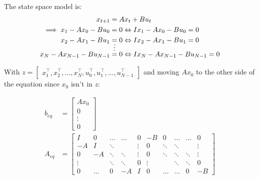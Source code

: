 \documentclass[11pt, a4paper, english]{NTNUoving}
\begin{document}
\begin{oppgave}
\begin{punkt}
    \end{punkt}

    \begin{punkt}
        \label{1d}

        The state space model is:
        \begin{align*}
            x_{t+1} &= Ax_t + Bu_t \\
            \implies x_1 -Ax_0 -Bu_0 &= 0 \Leftrightarrow Ix_1 - Ax_0 - Bu_0 = 0 \\
             x_2 -Ax_1 -Bu_1 &= 0 \Leftrightarrow Ix_2 - Ax_1 - Bu_1 = 0 \\
            &\shortvdotswithin{=}
             x_N -Ax_{N-1} -Bu_{N-1} &= 0 \Leftrightarrow Ix_{N} - Ax_{N-1} - Bu_{N-1} = 0
        \end{align*}

        With $z = \begin{bmatrix}
            x_1^\top, x_2^\top, ..., x_N^\top, u_0^\top, u_1^\top, ..., u_{N-1}^\top
        \end{bmatrix}$ and moving $Ax_0$ to the other side of the equation since $x_0$ isn't in $z$:

        \begin{align*}
            b_{eq} &= \begin{bmatrix}
                Ax_0 \\
                0 \\
                \vdots \\
                0
            \end{bmatrix} \\
            A_{eq} &= \begin{bmatrix}
                I & 0 & \dots &  \dots & 0 & -B & 0 & \dots & \dots & 0 \\
                -A & I & \ddots &  & \vdots & 0 & \ddots & \ddots & & \vdots \\
                0 & -A & \ddots & \ddots & \vdots & 0 & \ddots & \ddots & \ddots & \vdots \\
                \vdots &  & \ddots & \ddots & 0 & \vdots &  & \ddots & \ddots & 0 \\
                0 & \dots & 0 & -A & I & 0 & \dots & \dots & 0 & -B
            \end{bmatrix}
        \end{align*}


\end{punkt}
\end{oppgave}
\end{document}
